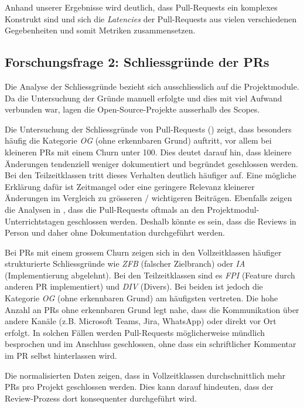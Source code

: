 Anhand unserer Ergebnisse wird deutlich, dass Pull-Requests ein komplexes Konstrukt sind und sich die \textit{Latencies} der Pull-Requests aus vielen verschiedenen Gegebenheiten und somit Metriken zusammensetzen.

\subsection{Forschungsfrage 2: Schliessgründe der PRs}
Die Analyse der Schliessgründe bezieht sich ausschliesslich auf die Projektmodule. Da die Untersuchung der Gründe manuell erfolgte und dies mit viel Aufwand verbunden war, lagen die Open-Source-Projekte ausserhalb des Scopes.

Die Untersuchung der Schliessgründe von Pull-Requests () zeigt, dass besonders häufig die Kategorie \textit{OG} (ohne erkennbaren Grund) auftritt, vor allem bei kleineren PRs mit einem Churn unter 100. Dies deutet darauf hin, dass kleinere Änderungen tendenziell weniger dokumentiert und begründet geschlossen werden. 
Bei den  Teilzeitklassen tritt dieses Verhalten deutlich häufiger auf. Eine mögliche Erklärung dafür ist Zeitmangel oder eine geringere Relevanz kleinerer Änderungen im Vergleich zu grösseren / wichtigeren Beiträgen. Ebenfalls zeigen die Analysen in , dass die Pull-Requests oftmals an den Projektmodul-Unterrichtstagen geschlossen werden. Deshalb könnte es sein, dass die Reviews in Person und daher ohne Dokumentation durchgeführt werden. 

Bei PRs mit einem grossem Churn zeigen sich in den Vollzeitklassen häufiger strukturierte Schliessgründe wie \textit{ZFB} (falscher Zielbranch) oder \textit{IA} (Implementierung
abgelehnt). Bei den Teilzeitklassen sind es \textit{FPI} (Feature durch anderen
PR implementiert) und \textit{DIV} (Divers). Bei beiden ist jedoch die Kategorie \textit{OG} (ohne erkennbaren Grund) am häufigsten vertreten. 
Die hohe Anzahl an PRs ohne erkennbaren Grund legt nahe, dass die Kommunikation über andere Kanäle (z.B. Microsoft Teams, Jira, WhatsApp) oder direkt vor Ort erfolgt. In solchen Fällen werden Pull-Requests möglicherweise mündlich besprochen und im Anschluss geschlossen, ohne dass ein schriftlicher Kommentar im PR selbst hinterlassen wird.

Die normalisierten Daten zeigen, dass in Vollzeitklassen durchschnittlich mehr PRs pro Projekt geschlossen werden. Dies kann darauf hindeuten, dass der Review-Prozess dort konsequenter durchgeführt wird.


